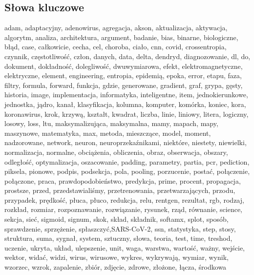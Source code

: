 \documentclass{article}
\begin{document}
\subsection{Słowa kluczowe}
adam, adaptacyjny, adenowirus, agregacja, akson, aktualizacja, aktywacja, algorytm, analiza, architektura, argument, badanie, bias, binarne, biologiczne, błąd, case, całkowicie, cecha, cel, choroba, ciało, cnn, covid, crossentropia, czynnik, częstotliwość, człon, danych, data, delta, dendryd, diagnozowanie, dl, do, dokument, dokładność, dolegliwość, dwuwymiarowa, efekt, elektromagnetyczne, elektryczne, element, engineering, entropia, epidemią, epoka, error, etapu, faza, filtry, formula, forward, funkcja, gdzie, generowane, gradient, graf, grypa, gęsty, historia, image, implementacja, informatyka, inteligentne, item, jednokierunkowe, jednostka, jądro, kanał, klasyfikacja, kolumna, komputer, komórka, koniec, kora, koronawirus, krok, krzywą, kształt, kwadrat, liczba, linie, liniowy, litera, logiczny, losowy, loss, ltu, maksymalizująca, maksymalna, mamy, mapach, mapy, maszynowe, matematyka, max, metoda, mieszczące, model, moment, nadzorowane, network, neuron, neuroprzekaźnikami, niektóre, niestety, niewielki, normalizacja, normalne, obciążenia, obliczenia, obraz, obserwacja, obszary, odległość, optymalizacja, oszacowanie, padding, parametry, partia, pcr, pediction, piksela, pionowe, podpis, podsekcja, pola, pooling, porzucenie, postać, połączenie, połączone, praca, prawdopodobieństwo, predykcja, prime, procent, propagacja, prostsze, przed, przedstawialiśmy, przetrenowania, przetwarzających, przodu, przypadek, prędkość, płuca, płuco, redukcja, relu, rentgen, rezultat, rgb, rodzaj, rozkład, rozmiar, rozpoznawanie, rozwiązanie, rysunek, rząd, równanie, science, sekcja, sieć, sigmoid, signum, skok, skład, składnik, softamx, splot, sposób, sprawdzenie, sprzężenie, spłaszczyć,SARS-CoV-2, ssn, statystyka, step, stosy, struktura, suma, sygnał, system, sztuczny, słowa, teoria, test, time, treshod, uczenie, ukryta, układ, ulepszenie, unit, waga, warstwa, wartość, ważny, wejście, wektor, widać, widzi, wirus, wirusowe, wykres, wykrywają, wymiar, wynik, wzorzec, wzrok, zapalenie, zbiór, zdjęcie, zdrowe, złożone, łącza, środkowa\\

\vspace{0.4cm}
\end{document}
